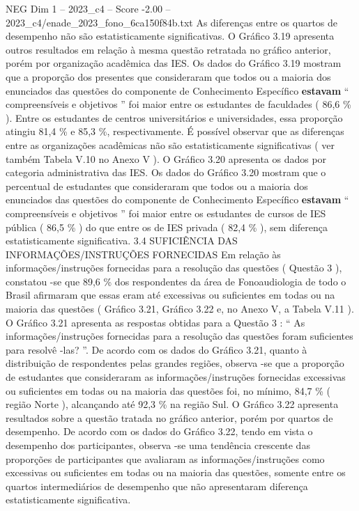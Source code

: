 \begin{textsample}{NEG Dim 1 – 2023\_c4 – Score -2.00 – 2023\_c4/enade\_2023\_fono\_6ca150f84b.txt}
As diferenças entre os quartos de desempenho não são estatisticamente significativas.
O Gráfico 3.19 apresenta outros resultados em relação à mesma questão retratada no gráfico anterior, porém por organização acadêmica das IES.
Os dados do Gráfico 3.19 mostram que a proporção dos presentes que consideraram que todos ou a maioria dos enunciados das questões do componente de Conhecimento Específico \textbf{estavam} “ compreensíveis e objetivos ” foi maior entre os estudantes de faculdades ( 86,6 \% ).
Entre os estudantes de centros universitários e universidades, essa proporção atingiu 81,4 \% e 85,3 \%, respectivamente.
É possível observar que as diferenças entre as organizações acadêmicas não são estatisticamente significativas ( ver também Tabela V.10 no Anexo V ).
O Gráfico 3.20 apresenta os dados por categoria administrativa das IES.
Os dados do Gráfico 3.20 mostram que o percentual de estudantes que consideraram que todos ou a maioria dos enunciados das questões do componente de Conhecimento Específico \textbf{estavam} “ compreensíveis e objetivos ” foi maior entre os estudantes de cursos de IES pública ( 86,5 \% ) do que entre os de IES privada ( 82,4 \% ), sem diferença estatisticamente significativa. 3.4 SUFICIÊNCIA DAS INFORMAÇÕES/INSTRUÇÕES FORNECIDAS Em relação às informações/instruções fornecidas para a resolução das questões ( Questão 3 ), constatou -se que 89,6 \% dos respondentes da área de Fonoaudiologia de todo o Brasil afirmaram que essas eram até excessivas ou suficientes em todas ou na maioria das questões ( Gráfico 3.21, Gráfico 3.22 e, no Anexo V, a Tabela V.11 ).
O Gráfico 3.21 apresenta as respostas obtidas para a Questão 3 : “ As informações/instruções fornecidas para a resolução das questões foram suficientes para resolvê -las? ”.
De acordo com os dados do Gráfico 3.21, quanto à distribuição de respondentes pelas grandes regiões, observa -se que a proporção de estudantes que consideraram as informações/instruções fornecidas excessivas ou suficientes em todas ou na maioria das questões foi, no mínimo, 84,7 \% ( região Norte ), alcançando até 92,3 \% na região Sul.
O Gráfico 3.22 apresenta resultados sobre a questão tratada no gráfico anterior, porém por quartos de desempenho.
De acordo com os dados do Gráfico 3.22, tendo em vista o desempenho dos participantes, observa -se uma tendência crescente das proporções de participantes que avaliaram as informações/instruções como excessivas ou suficientes em todas ou na maioria das questões, somente entre os quartos intermediários de desempenho que não apresentaram diferença estatisticamente significativa.

\end{textsample}
